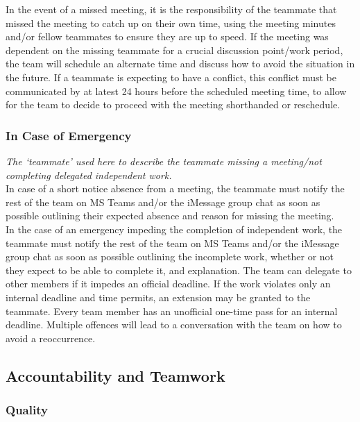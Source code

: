 \documentclass{article}
\begin{document}
In the event of a missed meeting, it is the responsibility of the teammate that missed the meeting to catch up on their own time, using the meeting minutes and/or fellow teammates to ensure they are up to speed. If the meeting was dependent on the missing teammate for a crucial discussion point/work period, the team will schedule an alternate time and 	discuss how to avoid the situation in the future. If a teammate is expecting to have a conflict, this conflict must be communicated by at latest 24 hours before the scheduled meeting time, to allow for the team to decide to proceed with the meeting shorthanded or reschedule. \\

\subsubsection*{In Case of Emergency}

\textit{The ‘teammate’ used here to describe the teammate missing a meeting/not completing delegated independent work.} \\
 
In case of a short notice absence from a meeting, the teammate must notify the rest of the team on MS Teams and/or the iMessage group chat as soon as possible outlining their expected absence and reason for missing the meeting.  \\

In the case of an emergency impeding the completion of independent work, the teammate must notify the rest of the team on MS Teams and/or the iMessage group chat as soon as possible outlining the incomplete work, whether or not they expect to be able to complete it, and explanation. The team can delegate to other members if it impedes an official deadline. If the work violates only an internal deadline and time permits, an extension may be granted to the teammate. Every team member has an unofficial one-time pass for an internal deadline. Multiple offences will lead to a conversation with the team on how to avoid a reoccurrence. 

\subsection*{Accountability and Teamwork}

\subsubsection*{Quality} 
\end{document}
